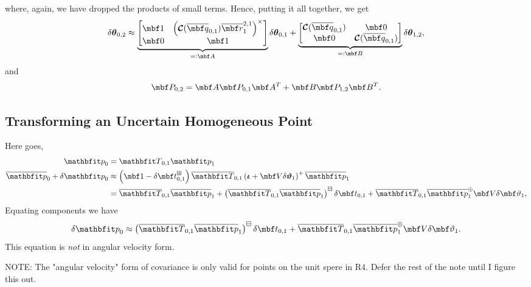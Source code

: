\documentclass[11pt,a4,oneside]{article}
\begin{document}
where, again, we have dropped the products of small terms. 
Hence, putting it all together, we get
\begin{equation}
  \label{eq:t02}
  \mbsdel \theta_{0,2} \approx
  \underbrace{
     \bbm
       \mbf 1 & \left( \mbc C(\mbfbar q_{0,1}) \mbfbar r_{1}^{2,1} \right)^\times\\
       \mbf 0 & \mbf 1
     \ebm
   }_{=: \mbf A}
     \mbsdel \theta_{0,1}
     +
     \underbrace {
     \bbm
       \mbc C(\mbfbar q_{0,1}) & \mbf 0\\
       \mbf 0                 & \mbc C(\mbfbar q_{0,1})
     \ebm
   }_{=: \mbf B}
     \mbsdel \theta_{1,2},
\end{equation}
and
\begin{equation}
  \label{eq:uncertain-composed}
  \mbf P_{0,2} = \mbf A \mbf P_{0,1} \mbf A^T + \mbf B \mbf P_{1,2} \mbf B^T.
\end{equation}
\subsection{Transforming an Uncertain Homogeneous Point}
Here goes,
\begin{subequations}
  \begin{flalign}
    \mbfh p_{0} &= \mbfh T_{0,1} \mbfh p_{1}\\
    \mbfhbar p_0 + \mbfhdel p_0
    &\approx \left(\mbf 1 - \mbfdel t_{0,1}^\boxplus  \right) \mbfhbar T_{0,1} \left( \mbs \iota + \mbf V \mbsdel \vartheta_1 \right)^{+} \mbfhbar p_1\\
 &= \mbfhbar T_{0,1} \mbfhbar p_1  +  \left(\mbfhbar T_{0,1} \mbfhbar p_1\right)^\boxminus \mbfdel t_{0,1} + \mbfhbar T_{0,1}\mbfhbar p_1^\oplus \mbf V \mbfdel \vartheta_1,
  \end{flalign}
\end{subequations}
Equating components we have
\begin{equation}
  \label{eq:homo-transformed}
  \mbfhdel p_0 \approx \left(\mbfhbar T_{0,1} \mbfhbar p_1\right)^\boxminus \mbfdel t_{0,1} + \mbfhbar T_{0,1}\mbfhbar p_1^\oplus \mbf V \mbfdel \vartheta_1.
\end{equation}
This equation is {\em not} in angular velocity form.
%
%
%

NOTE: The "angular velocity" form of covariance is only valid for points on the unit spere in R4. Defer the rest of the note until I figure this out.
\end{document}
